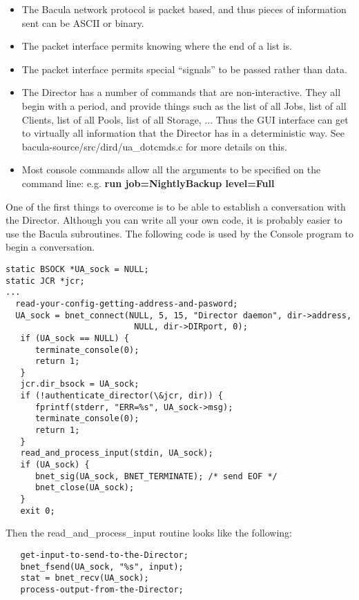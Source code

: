 \begin{itemize}
\item The Bacula network protocol is packet based, and  thus pieces of
information sent can be ASCII or binary.  
\item The packet interface permits knowing where the end of  a list is.  
\item The packet interface permits special ``signals''  to be passed rather
than data.  
\item The Director has a number of commands that are  non-interactive. They
all begin with a period,  and provide things such as the list of all Jobs, 
list of all Clients, list of all Pools, list of  all Storage, ... Thus the GUI
interface can get  to virtually all information that the Director has  in a
deterministic way. See  \lt{}bacula-source\gt{}/src/dird/ua\_dotcmds.c for 
more details on this.  
\item Most console commands allow all the arguments to  be specified on the
command line: e.g.  {\bf run job=NightlyBackup level=Full} 
\end{itemize}

One of the first things to overcome is to be able to establish a conversation
with the Director. Although you can write all your own code, it is probably
easier to use the Bacula subroutines. The following code is used by the
Console program to begin a conversation. 

\footnotesize
\begin{verbatim}
static BSOCK *UA_sock = NULL;
static JCR *jcr;
...
  read-your-config-getting-address-and-pasword;
  UA_sock = bnet_connect(NULL, 5, 15, "Director daemon", dir->address,
                          NULL, dir->DIRport, 0);
   if (UA_sock == NULL) {
      terminate_console(0);
      return 1;
   }
   jcr.dir_bsock = UA_sock;
   if (!authenticate_director(\&jcr, dir)) {
      fprintf(stderr, "ERR=%s", UA_sock->msg);
      terminate_console(0);
      return 1;
   }
   read_and_process_input(stdin, UA_sock);
   if (UA_sock) {
      bnet_sig(UA_sock, BNET_TERMINATE); /* send EOF */
      bnet_close(UA_sock);
   }
   exit 0;
\end{verbatim}
\normalsize

Then the read\_and\_process\_input routine looks like the following: 

\footnotesize
\begin{verbatim}
   get-input-to-send-to-the-Director;
   bnet_fsend(UA_sock, "%s", input);
   stat = bnet_recv(UA_sock);
   process-output-from-the-Director;
\end{verbatim}
\normalsize

